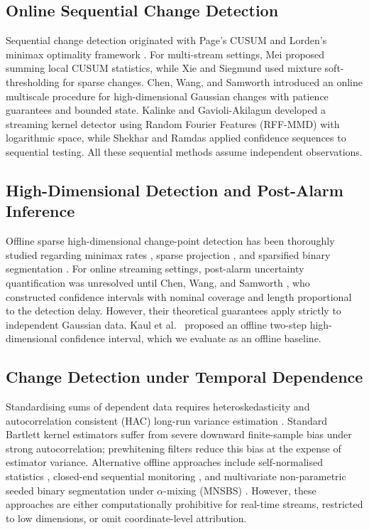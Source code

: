 \documentclass[lettersize,journal]{IEEEtran}
\begin{document}
\subsection{Online Sequential Change Detection}
Sequential change detection originated with Page's CUSUM \cite{page1954continuous} and Lorden's minimax optimality framework \cite{moustakides1986optimal}. For multi-stream settings, Mei \cite{mei2010efficient} proposed summing local CUSUM statistics, while Xie and Siegmund \cite{xie2013sequential} used mixture soft-thresholding for sparse changes. Chen, Wang, and Samworth \cite{chen2020high} introduced an online multiscale procedure for high-dimensional Gaussian changes with patience guarantees and bounded state. Kalinke and Gavioli-Akilagun \cite{kalinke2025streaming} developed a streaming kernel detector using Random Fourier Features (RFF-MMD) with logarithmic space, while Shekhar and Ramdas \cite{shekhar2023nonparametric} applied confidence sequences to sequential testing. All these sequential methods assume independent observations.

\subsection{High-Dimensional Detection and Post-Alarm Inference}
Offline sparse high-dimensional change-point detection has been thoroughly studied regarding minimax rates \cite{cai2015sparse}, sparse projection \cite{wang2018high}, and sparsified binary segmentation \cite{cho2015multiple}. For online streaming settings, post-alarm uncertainty quantification was unresolved until Chen, Wang, and Samworth \cite{chen2024high}, who constructed confidence intervals with nominal coverage and length proportional to the detection delay. However, their theoretical guarantees apply strictly to independent Gaussian data. Kaul et al.~\cite{kaul2019efficient} proposed an offline two-step high-dimensional confidence interval, which we evaluate as an offline baseline.

\subsection{Change Detection under Temporal Dependence}
Standardising sums of dependent data requires heteroskedasticity and autocorrelation consistent (HAC) long-run variance estimation \cite{newey1987simple,andrews1991heteroskedasticity}. Standard Bartlett kernel estimators suffer from severe downward finite-sample bias under strong autocorrelation; prewhitening filters \cite{andrews1992improved} reduce this bias at the expense of estimator variance. Alternative offline approaches include self-normalised statistics \cite{shao2010self}, closed-end sequential monitoring \cite{aue2013structural}, and multivariate non-parametric seeded binary segmentation under $\alpha$-mixing (MNSBS) \cite{madridpadilla2023nonparametric}. However, these approaches are either computationally prohibitive for real-time streams, restricted to low dimensions, or omit coordinate-level attribution.
\end{document}

